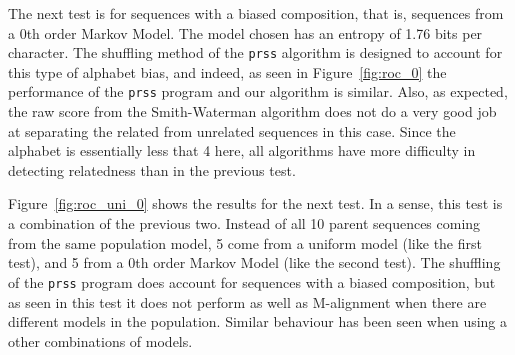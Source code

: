 \documentclass[letterpaper,11pt,oneside]{article}
\begin{document}
The next test is for sequences with a biased composition, that is, sequences
from a 0th order Markov Model.  The model chosen has an entropy of 1.76 bits
per character.  The shuffling method of the \verb!prss! algorithm is designed
to account for this type of alphabet bias, and indeed, as seen in
Figure~\ref{fig:roc_0} the performance of the \verb!prss! program and our
algorithm is similar.  Also, as expected, the raw score from the
Smith-Waterman algorithm does not do a very good job at separating the related
from unrelated sequences in this case.  Since the alphabet is essentially less
that 4 here, all algorithms have more difficulty in detecting relatedness than
in the previous test.


Figure~\ref{fig:roc_uni_0} shows the results for the next test.  In a sense,
this test is a combination of the previous two.  Instead of all 10 parent
sequences coming from the same population model, 5 come from a uniform model
(like the first test), and 5 from a 0th order Markov Model (like the second
test).  The shuffling of the \verb!prss! program does account for sequences
with a biased composition, but as seen in this test it does not perform as
well as M-alignment when there are different models in the population.
Similar behaviour has been seen when using a other combinations of models.

\end{document}
